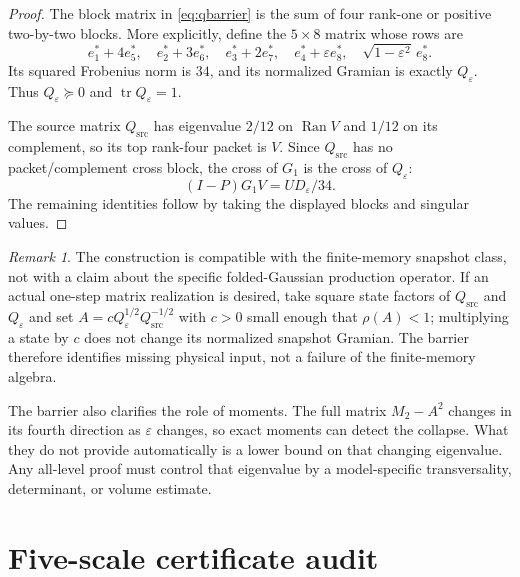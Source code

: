 \documentclass[11pt]{article}
\theoremstyle{definition}
\theoremstyle{remark}
\newtheorem{remark}[theorem]{Remark}
\newcommand{\tr}{\operatorname{tr}}
\begin{document}
\begin{proof}
The block matrix in \eqref{eq:qbarrier} is the sum of four rank-one or
positive two-by-two blocks.  More explicitly, define the $5\times8$ matrix
whose rows are
\begin{equation}
 e_1^*+4e_5^*,\quad e_2^*+3e_6^*,\quad
 e_3^*+2e_7^*,\quad e_4^*+\varepsilon e_8^*,\quad
 \sqrt{1-\varepsilon^2}\,e_8^*.
 \label{eq:factorbarrier}
\end{equation}
Its squared Frobenius norm is $34$, and its normalized Gramian is
exactly $Q_\varepsilon$.  Thus $Q_\varepsilon\succeq0$ and
$\tr Q_\varepsilon=1$.

The source matrix $Q_{\mathrm{src}}$ has eigenvalue $2/12$ on $\operatorname{Ran}V$ and
$1/12$ on its complement, so its top rank-four packet is $V$.  Since
$Q_{\mathrm{src}}$
has no packet/complement cross block, the cross of $G_1$ is the cross of
$Q_\varepsilon$:
\begin{equation*}
 (I-P)G_1V=UD_\varepsilon/34.
\end{equation*}
The remaining identities follow by taking the displayed blocks and singular
values.
\end{proof}

\begin{remark}
The construction is compatible with the finite-memory snapshot class, not
with a claim about the specific folded-Gaussian production operator.  If an
actual one-step matrix realization is desired, take square state factors of
$Q_{\mathrm{src}}$ and $Q_\varepsilon$ and set
$A=cQ_\varepsilon^{1/2}Q_{\mathrm{src}}^{-1/2}$ with $c>0$ small enough that
$\rho(A)<1$; multiplying a state by $c$ does not change its normalized
snapshot Gramian.  The barrier therefore identifies missing physical input,
not a failure of the finite-memory algebra.
\end{remark}

The barrier also clarifies the role of moments.  The full matrix
$M_2-A^2$ changes in its fourth direction as $\varepsilon$ changes, so exact
moments can detect the collapse.  What they do not provide automatically is
a lower bound on that changing eigenvalue.  Any all-level proof must control
that eigenvalue by a model-specific transversality, determinant, or volume
estimate.

\section{Five-scale certificate audit}
\label{sec:audit}
\end{document}

